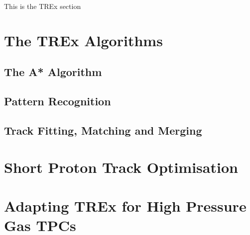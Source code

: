 This is the TREx section
\section{The TREx Algorithms}
\subsection{The A* Algorithm}
\subsection{Pattern Recognition}
\subsection{Track Fitting, Matching and Merging}
\section{Short Proton Track Optimisation}
\section{Adapting TREx for High Pressure Gas TPCs}
